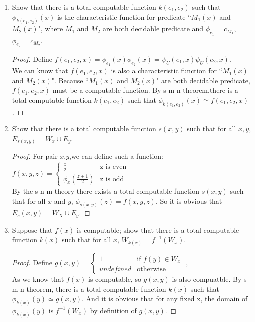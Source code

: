 \documentclass[12pt,a4paper]{article}
\theoremstyle{definition}
\numberwithin{equation}{section}
\numberwithin{figure}{section}
\begin{document}
\begin{enumerate}
\item Show that there is a total computable function $k(e_1, e_2)$ such that $\phi_{k(e_1,e_2)}(x)$ is the characteristic function for predicate ``$M_1(x)$ and $M_2(x)$", where $M_1$ and $M_2$ are both decidable predicate and $\phi_{e_1}=c_{M_1}$,  $\phi_{e_2}=c_{M_2}$.
\begin{proof}
Define $f(e_1,e_2,x) = \phi_{e_1}(x)\phi_{e_2}(x) = \psi_U(e_1, x)\psi_U(e_2,x)$. \\
We can know that $f(e_1, e_2, x)$ is also a characteristic function for ``$M_1(x)$ and $M_2(x)$". Because ``$M_1(x)$ and $M_2(x)$" are both decidable predicate, $f(e_1, e_2, x)$ must be a computable function. By s-m-n theorem,there is a total computable function $k(e_1, e_2)$ such that $\phi_{k(e_1,e_2)}(x) \simeq f(e_1, e_2, x)$.
\end{proof}

\item Show that there is a total computable function $s(x,y)$ such that for all $x,y$, $E_{s(x,y)}=W_x \cup E_y$.
\begin{proof}
For pair $x$,$y$,we can define such a function:
   $f(x,y,z)= \begin{cases} \frac{z}{2} & \mbox {z is even}\\
    \phi_x(\frac{z+1}{2}) & \mbox {z is odd}
        \end{cases}$ \\
By the s-n-m theory there exists a total computable function $s(x,y)$ such that for all $x$ and $y$, $\phi_{s(x,y)}(z) = f(x,y,z)$. So it is obvious that $E_s(x,y) = W_X\cup E_y$.
\end{proof}

\item Suppose that $f(x)$ is computable; show that there is a total computable function $k(x)$ such that for all $x$, $W_{k(x)}=f^{-1}(W_x)$.
\begin{proof}
Define     $g(x,y)=\left\{\begin{array}{ll}
    1& \mbox{if } f(y)\in W_x\\
    undefined & \mbox{otherwise}
    \end{array}\right.$ ,\\
As we know that $f(x)$ is computable, so $g(x,y)$ is also compuatble. By s-m-n theorem, there is a total computable function $k(x)$ such that $\phi_{k(x)}(y) \simeq g(x,y)$. And it is obvious that for any fixed x, the domain of $\phi_{k(x)}(y)$ is $f^{-1}(W_x)$ by definition of $g(x,y)$.
\end{proof}
\end{enumerate}



\end{document}
